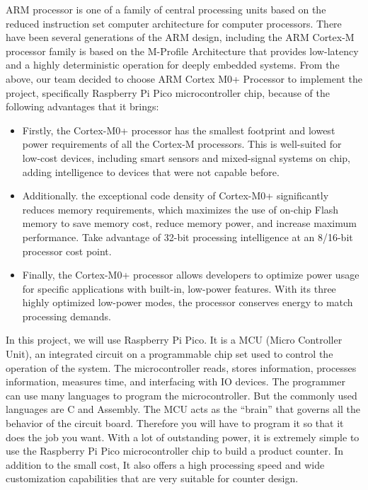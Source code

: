 \documentclass[a4paper,twoside]{report}
\begin{document}
ARM processor is one of a family of central processing units based on the reduced instruction set computer architecture for computer processors. There have been several generations of the ARM design, including the ARM Cortex-M processor family is based on the M-Profile Architecture that provides low-latency and a highly deterministic operation for deeply embedded systems. From the above, our team decided to choose ARM Cortex M0+ Processor to implement the project, specifically Raspberry Pi Pico microcontroller chip, because of the following advantages that it brings:
\begin{itemize}
\item Firstly, the Cortex-M0+ processor has the smallest footprint and lowest power requirements of all the Cortex-M processors. This is well-suited for low-cost devices, including smart sensors and mixed-signal systems on chip, adding intelligence to devices that were not capable before.

\item Additionally. the exceptional code density of Cortex-M0+ significantly reduces memory requirements, which maximizes the use of on-chip Flash memory to save memory cost, reduce memory power, and increase maximum performance. Take advantage of 32-bit processing intelligence at an 8/16-bit processor cost point.

\item Finally, the Cortex-M0+ processor allows developers to optimize power usage for specific applications with built-in, low-power features. With its three highly optimized low-power modes, the processor conserves energy to match processing demands.
\end{itemize}

In this project, we will use Raspberry Pi Pico. It is a MCU (Micro Controller Unit), an integrated circuit on a programmable chip set used to control the operation of the system. The microcontroller reads, stores information, processes information, measures time, and interfacing with IO devices. The programmer can use many languages to program the microcontroller. But the commonly used languages are C and Assembly. The MCU acts as the ``brain'' that governs all the behavior of the circuit board. Therefore you will have to program it so that it does the job you want. With a lot of outstanding power, it is extremely simple to use the Raspberry Pi Pico microcontroller chip to build a product counter. In addition to the small cost, It also offers a high processing speed and wide customization capabilities that are very suitable for counter design.
\end{document}
